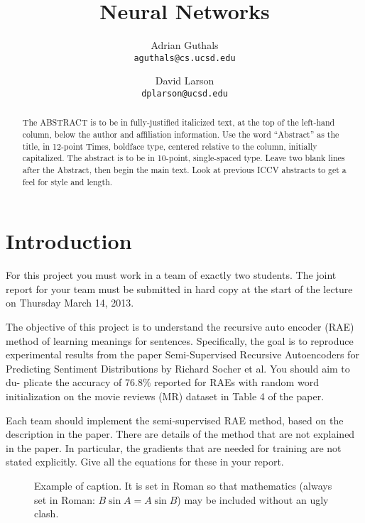 \documentclass[10pt,twocolumn,letterpaper]{article}
\begin{document}
\title{Neural Networks}

\author{Adrian Guthals \\
{\tt\small aguthals@cs.ucsd.edu}
\and
David Larson \\
{\tt\small dplarson@ucsd.edu}
}

\maketitle
\thispagestyle{empty}

\begin{abstract}
   The ABSTRACT is to be in fully-justified italicized text, at the top
   of the left-hand column, below the author and affiliation
   information. Use the word ``Abstract'' as the title, in 12-point
   Times, boldface type, centered relative to the column, initially
   capitalized. The abstract is to be in 10-point, single-spaced type.
   Leave two blank lines after the Abstract, then begin the main text.
   Look at previous ICCV abstracts to get a feel for style and length.
\end{abstract}

\section{Introduction}

For this project you must work in a team of exactly two students. The joint report for your team must be submitted in hard copy at the start of the lecture on Thursday March 14, 2013.

The objective of this project is to understand the recursive auto encoder (RAE) method of learning meanings for sentences. Specifically, the goal is to reproduce experimental results from the paper Semi-Supervised Recursive Autoencoders for Predicting Sentiment Distributions by Richard Socher et al. You should aim to du- plicate the accuracy of 76.8\% reported for RAEs with random word initialization on the movie reviews (MR) dataset in Table 4 of the paper.

Each team should implement the semi-supervised RAE method, based on the description in the paper. There are details of the method that are not explained in the paper. In particular, the gradients that are needed for training are not stated explicitly. Give all the equations for these in your report.

\begin{figure}[t]
\begin{center}
\fbox{\rule{0pt}{2in} \rule{0.9\linewidth}{0pt}}
\end{center}
   \caption{Example of caption.  It is set in Roman so that mathematics
   (always set in Roman: $B \sin A = A \sin B$) may be included without an
   ugly clash.}
\label{fig:long}
\label{fig:onecol}
\end{figure}
\end{document}
